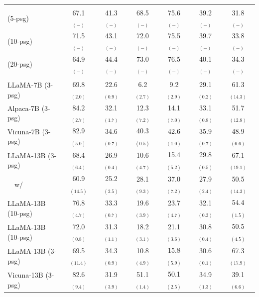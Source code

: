 \documentclass[11pt]{article}
\newcommand{\vani}{{\sc{Vanilla}}}
\newcommand{\summ}{{\sc{Summ}}}
\newcommand{\snippet}{{\sc{Snippet}}}
\newcommand{\rerank}{{\sc{Rerank}}}
\newcommand{\oracle}{{\sc{Oracle}}}
\newcommand{\tableskip}{\noalign{\vskip 2pt}}
\newcommand{\headercolorlong}{\rowcolor{gray!17}}
\begin{document}
\begin{table}[h]
\begin{tabular}{lcccccc}
            \headercolorlong
            \tableskip
            \multicolumn{7}{c}{\textbf{GPT-4}} \\
            \tableskip

            \vani{} (5-psg)  & 67.1 $_{(-)}$&41.3 $_{(-)}$&68.5 $_{(-)}$&75.6 $_{(-)}$&39.2 $_{(-)}$&31.8 $_{(-)}$\\
            \vani{} (10-psg) & 71.5 $_{(-)}$&43.1 $_{(-)}$&72.0 $_{(-)}$&75.5 $_{(-)}$&39.7 $_{(-)}$&33.8 $_{(-)}$\\
            \vani{} (20-psg) & 64.9 $_{(-)}$&44.4 $_{(-)}$&73.0 $_{(-)}$&76.5 $_{(-)}$&40.1 $_{(-)}$&34.3 $_{(-)}$\\

            \headercolorlong
            \tableskip
            \multicolumn{7}{c}{\textbf{Open-source} } \\
            \tableskip
            LLaMA-7B \vani{} (3-psg) & 69.8 $_{(2.0)}$ & 22.6 $_{(0.9)}$ & 6.2 $_{(2.7)}$ & 9.2 $_{(2.9)}$ & 29.1 $_{(0.2)}$ & 61.3 $_{(14.3)}$ \\
            Alpaca-7B \vani{} (3-psg) & 84.2 $_{(2.7)}$ & 32.1 $_{(1.7)}$ & 12.3 $_{(7.2)}$ & 14.1 $_{(7.0)}$ & 33.1 $_{(0.8)}$ & 51.7 $_{(12.8)}$ \\
            Vicuna-7B \vani{} (3-psg) & 82.9 $_{(5.0)}$ & 34.6 $_{(0.7)}$ & 40.3 $_{(0.5)}$ & 42.6 $_{(1.0)}$ & 35.9 $_{(0.7)}$ & 48.9 $_{(6.6)}$ \\ \midrule
            LLaMA-13B \vani{} (3-psg) & 68.4 $_{(6.4)}$ & 26.9 $_{(0.4)}$ & 10.6 $_{(4.7)}$ & 15.4 $_{(5.2)}$ & 29.8 $_{(0.5)}$ & 67.1 $_{(19.1)}$ \\
            ~~w/ \rerank & 60.9 $_{(14.5)}$ & 25.2 $_{(2.5)}$ & 28.1 $_{(9.3)}$ & 37.0 $_{(7.2)}$ & 27.9 $_{(2.4)}$ & 50.5 $_{(14.3)}$ \\
            LLaMA-13B \summ{} (10-psg) & 76.8 $_{(4.7)}$ & 33.3 $_{(0.7)}$ & 19.6 $_{(3.9)}$ & 23.7 $_{(4.7)}$ & 32.1 $_{(0.3)}$ & 54.4 $_{(1.5)}$ \\
            LLaMA-13B \snippet{} (10-psg) & 72.0 $_{(0.8)}$ & 31.3 $_{(1.1)}$ & 18.2 $_{(3.1)}$ & 21.1 $_{(3.6)}$ & 30.8 $_{(0.4)}$ & 50.5 $_{(4.5)}$ \\
            LLaMA-13B \oracle{} (3-psg) & 69.5 $_{(11.4)}$ & 34.3 $_{(0.9)}$ & 10.8 $_{(4.9)}$ & 15.8 $_{(5.9)}$ & 30.6 $_{(0.1)}$ & 67.3 $_{(17.9)}$ \\ \midrule
            Vicuna-13B \vani{} (3-psg) & 82.6 $_{(9.4)}$ & 31.9 $_{(3.9)}$ & 51.1 $_{(1.4)}$ & 50.1 $_{(2.5)}$ & 34.9 $_{(1.3)}$ & 39.1 $_{(6.6)}$ \\

\end{tabular}
\end{table}
\end{document}
